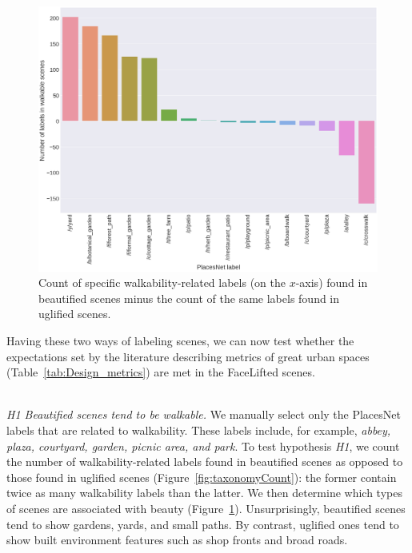 \begin{figure}[h]
    \centering
    \includegraphics[width=\columnwidth]{walkable_taxonomy.png}
    \caption{Count of specific walkability-related labels  (on the $x$-axis) found in beautified scenes minus the count of the same labels found in uglified scenes.}
    \label{fig:WalkableTnomy}
\end{figure}


Having these two ways of labeling scenes, we can now test whether the expectations set by the literature describing metrics of great urban spaces (Table~\ref{tab:Design_metrics}) are  met in the FaceLifted scenes. 


\mbox{ } \\
\noindent
\emph{H1 Beautified scenes tend to be walkable.}
We manually select only the PlacesNet labels that are related to walkability. These labels include, for example, \textit{abbey, plaza, courtyard, garden, picnic area, \textrm{and} park}. To test hypothesis \emph{H1}, we count the number of walkability-related labels found in beautified scenes as opposed to those found in uglified scenes (Figure~\ref{fig:taxonomyCount}): the former contain twice as many walkability labels than the latter. We then determine which types of scenes are associated with beauty (Figure~\ref{fig:WalkableTnomy}). Unsurprisingly, beautified scenes tend to show gardens, yards, and small paths. By contrast, uglified ones tend to show built environment features such as shop fronts and broad roads. 


